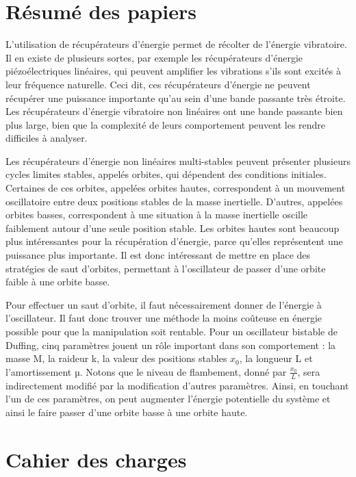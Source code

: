 \documentclass[a4paper, french, 12pt, titlepage]{report}
\begin{document}
\section{Résumé des papiers}

L'utilisation de récupérateurs d'énergie permet de récolter de l'énergie vibratoire. Il en existe de plusieurs sortes, par exemple les récupérateurs d'énergie piézoélectriques linéaires, qui peuvent amplifier les vibrations s'ils sont excités à leur fréquence naturelle. Ceci dit, ces récupérateurs d'énergie ne peuvent récupérer une puissance importante qu'au sein d'une bande passante très étroite. Les récupérateurs d'énergie vibratoire non linéaires ont une bande passante bien plus large, bien que la complexité de leurs comportement peuvent les rendre difficiles à analyser. 

Les récupérateurs d'énergie non linéaires multi-stables peuvent présenter plusieurs cycles limites stables, appelés orbites, qui dépendent des conditions initiales. Certaines de ces orbites, appelées orbites hautes, correspondent à un mouvement oscillatoire entre deux positions stables de la masse inertielle. D'autres, appelées orbites basses, correspondent à une situation à la masse inertielle oscille faiblement autour d'une seule position stable. Les orbites hautes sont beaucoup plus intéressantes pour la récupération d'énergie, parce qu'elles représentent une puissance plus importante. Il est donc intéressant de mettre en place des stratégies de saut d'orbites, permettant à l'oscillateur de passer d'une orbite faible à une orbite basse. 

Pour effectuer un saut d'orbite, il faut nécessairement donner de l'énergie à l'oscillateur. Il faut donc trouver une méthode la moins coûteuse en énergie possible pour que la manipulation soit rentable. Pour un oscillateur bistable de Duffing, cinq paramètres jouent un rôle important dans son comportement : la masse M, la raideur k, la valeur des positions stables $x_0$, la longueur L et l'amortissement µ. Notons que le niveau de flambement, donné par $\frac{x_0}{L}$, sera indirectement modifié par la modification d'autres paramètres. Ainsi, en touchant l'un de ces paramètres, on peut augmenter l'énergie potentielle du système et ainsi le faire passer d'une orbite basse à une orbite haute. 


\section{Cahier des charges}
\end{document}
